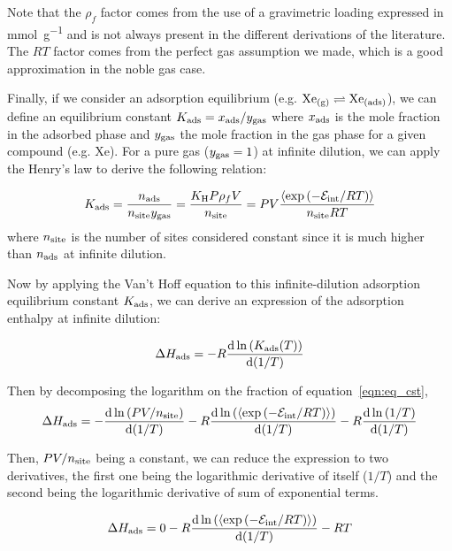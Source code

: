 \documentclass[main.tex]{subfiles}
\begin{document}
Note that the $\rho_f$ factor comes from the use of a gravimetric loading expressed in \si{\milli\mole\per\gram} and is not always present in the different derivations of the literature.\cite{PoreBlazer} The $RT$ factor comes from the perfect gas assumption we made, which is a good approximation in the noble gas case. 

Finally, if we consider an adsorption equilibrium (e.g. $\text{Xe}_{\text{(g)}} \rightleftharpoons \text{Xe}_{\text{(ads)}}$), we can define an equilibrium constant $K_{\text{ads}} = x_{\text{ads}}/y_{\text{gas}}$ where $x_{\text{ads}}$ is the mole fraction in the adsorbed phase and $y_{\text{gas}}$ the mole fraction in the gas phase for a given compound (e.g. Xe). For a pure gas ($y_{\text{gas}}=1$) at infinite dilution, we can apply the Henry's law to derive the following relation:

\begin{equation}\label{eqn:eq_cst}
  K_{\text{ads}} = \dfrac{n_{\text{ads}}}{n_{\text{site}}y_{\text{gas}}} = \dfrac{K_{\text{H}}P\rho_fV}{n_{\text{site}}} = PV \dfrac{\langle \exp\left(-\mathcal{E}_{\text{int}}/RT\right) \rangle}{n_{\text{site}}RT}
\end{equation}
where $n_{\text{site}}$ is the number of sites considered constant since it is much higher than $n_{\text{ads}}$ at infinite dilution.

Now by applying the Van't Hoff equation to this infinite-dilution adsorption equilibrium constant $K_{\text{ads}}$, we can derive an expression of the adsorption enthalpy at infinite dilution:

\begin{equation}
  \Delta H_{\text{ads}} = -R\dfrac{\mathop{}\mathopen{}\mathrm{d} \ln\left(K_{\text{ads}}(T)\right)}{\mathop{}\mathopen{}\mathrm{d} (1/T)}
\end{equation}

Then by decomposing the logarithm on the fraction of equation~\ref{eqn:eq_cst}, 
\begin{equation}
  \Delta H_{\text{ads}} = -\dfrac{\mathop{}\mathopen{}\mathrm{d} \ln\left(PV/n_{\text{site}}\right)}{\mathop{}\mathopen{}\mathrm{d} (1/T)} - R\dfrac{\mathop{}\mathopen{}\mathrm{d} \ln\left(\langle \exp\left(-\mathcal{E}_{\text{int}}/RT\right) \rangle\right)}{\mathop{}\mathopen{}\mathrm{d} (1/T)} - R\dfrac{\mathop{}\mathopen{}\mathrm{d} \ln\left(1/T\right)}{\mathop{}\mathopen{}\mathrm{d} (1/T)}
\end{equation}

Then, $PV/n_{\text{site}}$ being a constant, we can reduce the expression to two derivatives, the first one being the logarithmic derivative of itself ($1/T$) and the second being the logarithmic derivative of sum of exponential terms. 

\begin{equation}
  \Delta H_{\text{ads}} = 0 - R\dfrac{\mathop{}\mathopen{}\mathrm{d} \ln\left(\langle \exp\left(-\mathcal{E}_{\text{int}}/RT\right) \rangle\right)}{\mathop{}\mathopen{}\mathrm{d} (1/T)} - RT
\end{equation}
\end{document}
